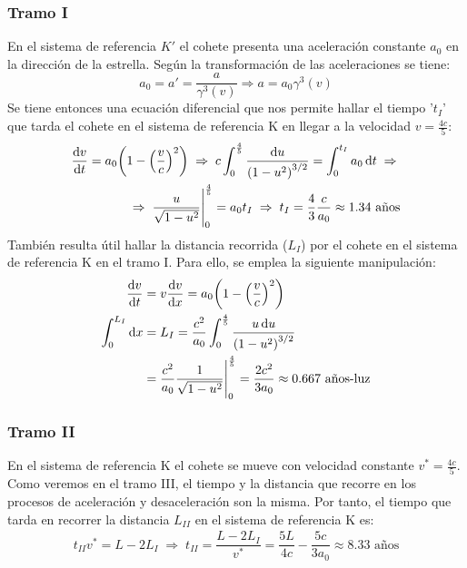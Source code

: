 \documentclass[11pt]{article}
\begin{document}
\subsubsection*{Tramo I}
En el sistema de referencia $K'$ el cohete presenta una aceleración constante $a_0$ en la dirección de la estrella. Según la transformación de las aceleraciones se tiene:
\begin{equation}
	\label{Transformación de Velocidades}
	a_0 = a' = \dfrac{a}{\gamma^3(v)} \Rightarrow a = a_0 \gamma^3(v)
\end{equation}
Se tiene entonces una ecuación diferencial que nos permite hallar el tiempo '$t_I$' que tarda el cohete en el sistema de referencia K en llegar a la velocidad $v = \frac{4c}{5}$:
\begin{align}
	\dv{v}{t} = a_0 \qty (1  - \qty(\dfrac{v}{c})^2) \;\Rightarrow\; c\int_{0}^{\frac{4}{5}} \dfrac{\dd{u}}{\qty(1-u^2)^{3/2}} = \int_{0}^{t_I} a_0 \dd{t} \;\Rightarrow\;\nonumber \\
	\Rightarrow\; \dfrac{u}{\sqrt{1-u^2}}\Bigg|_{0}^{\frac{4}{5}} = a_0 t_I \;\Rightarrow\; t_I = \dfrac{4}{3} \dfrac{c}{a_0} \approx 1.34 \textrm{ años} \label{Tiempo I}
\end{align}
También resulta útil hallar la distancia recorrida ($L_I$) por el cohete en el sistema de referencia K en el tramo I. Para ello, se emplea la siguiente manipulación:
\begin{align}
	\dv{v}{t}            & = v\dv{v}{x} = a_0 \qty(1 - \qty(\dfrac{v}{c})^2) \nonumber\\
	\int_{0}^{L_I}\dd{x} & = L_I = \dfrac{c^2}{a_0} \int_{0}^{\frac{4}{5}} \dfrac{u\dd{u}}{\qty(1-u^2)^{3/2}}\nonumber\\
	                     & = \dfrac{c^2}{a_0} \dfrac{1}{\sqrt{1-u^2}}\Bigg|_{0}^{\frac{4}{5}} = \dfrac{2c^2}{3a_0}  \approx  0.667 \textrm{ años-luz}\label{Distancia I}
\end{align}
\subsubsection*{Tramo II}
En el sistema de referencia K el cohete se mueve con velocidad constante $v^* = \frac{4c}{5}$. Como veremos en el tramo III, el tiempo y la distancia que recorre en los procesos de aceleración y desaceleración son la misma. Por tanto, el tiempo que tarda en recorrer la distancia $L_{II}$ en el sistema de referencia K es:
\begin{align}
    t_{II}v^* = L - 2L_I \;\Rightarrow\; t_{II} = \dfrac{L - 2L_I}{v^*} = \dfrac{5L}{4c} - \dfrac{5c}{3a_0}\approx  8.33\textrm{ años} \label{Tiempo II} 
\end{align}
\end{document}
